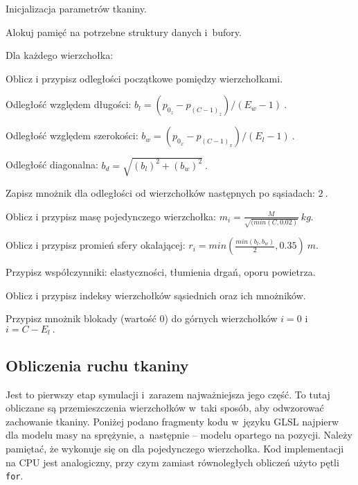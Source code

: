 		\begin{algorithm}
			\label{alg_5_4}
			\caption{Inicjalizacja parametrów tkaniny.}	
			
			Alokuj pamięć na potrzebne struktury danych i~bufory.
			
			Dla każdego wierzchołka:
			
			\Indp
			
				Oblicz i przypisz odległości początkowe pomiędzy wierzchołkami.
				
				\Indp
				
					Odległość względem długości: \( b_{l} = (p_{0_{z}} - p_{(C-1)_{z}}) / (E_{w} - 1) \ . \)
					
					Odległość względem szerokości: \( b_{w} = (p_{0_{x}} - p_{(C-1)_{x}}) / (E_{l} - 1) \ . \)
					
					Odległość diagonalna: \( b_{d} = \sqrt{ (b_{l})^{2} + (b_{w})^2 } \ . \)
					
					Zapisz mnożnik dla odległości od wierzchołków następnych po sąsiadach: \(2 \ .\)
				
				\Indm
			
				Oblicz i przypisz masę pojedynczego wierzchołka: \( m_{i} = \frac{M}{\sqrt{(min(C, 0.02)}} \  kg. \)
				
				Oblicz i przypisz promień sfery okalającej: \( r_{i} = min( \frac{min(b_{l}, b_{w})}{2}, 0.35 ) \ m. \)
				
				Przypisz współczynniki: elastyczności, tłumienia drgań, oporu powietrza.
				
				Oblicz i przypisz indeksy wierzchołków sąsiednich oraz ich mnożników.
			
			\Indm
			
			Przypisz mnożnik blokady (wartość \(0\)) do górnych wierzchołków \(i = 0\) i \(i = C - E_{l} \ .\)
			
		\end{algorithm}
			
		\subsection{Obliczenia ruchu tkaniny}
		\label{t:symulacja:dzialanie:ruch}
			
		
		Jest to pierwszy etap symulacji i~zarazem najważniejsza jego część. To tutaj obliczane są przemieszczenia wierzchołków w~taki sposób, aby odwzorować zachowanie tkaniny. Poniżej podano fragmenty kodu w~języku GLSL najpierw dla modelu masy na sprężynie, a~następnie -- modelu opartego na pozycji. Należy pamiętać, że wykonuje się on dla pojedynczego wierzchołka. Kod implementacji na CPU jest analogiczny, przy czym zamiast równoległych obliczeń użyto pętli \texttt{for}.
		\newpage	
		
